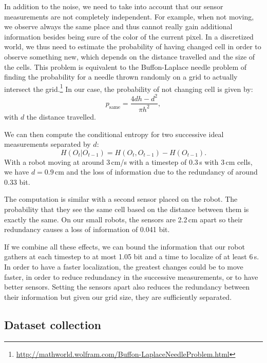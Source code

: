 \documentclass[letterpaper, 10pt, conference]{ieeeconf}
\begin{document}
In addition to the noise, we need to take into account that our sensor measurements are not completely independent.
For example, when not moving, we observe always the same place and thus cannot really gain additional information besides being sure of the color of the current pixel.
In a discretized world, we thus need to estimate the probability of having changed cell in order to observe something new, which depends on the distance travelled and the size of the cells.
This problem is equivalent to the Buffon-Laplace needle problem of finding the probability for a needle thrown randomly on a grid to actually intersect the grid.\footnote{\url{http://mathworld.wolfram.com/Buffon-LaplaceNeedleProblem.html}}
In our case, the probability of not changing cell is given by:
\begin{displaymath}
	p_{\mbox{same}} = \frac{4d h - d^2}{\pi h^2},
\end{displaymath}
with $d$ the distance travelled.

We can then compute the conditional entropy for two successive ideal measurements separated by $d$:
\begin{displaymath}
	H(O_t | O_{t-1}) = H(O_t, O_{t-1}) - H(O_{t-1}).
\end{displaymath}
With a robot moving at around 3\,cm/s with a timestep of 0.3\,s with 3\,cm cells, we have $d=0.9$\,cm and the loss of information due to the redundancy of around 0.33 bit.

The computation is similar with a second sensor placed on the robot.
The probability that they see the same cell based on the distance between them is exactly the same.
On our small robots, the sensors are 2.2\,cm apart so their redundancy causes a loss of information of 0.041 bit.

If we combine all these effects, we can bound the information that our robot gathers at each timestep to at most 1.05 bit and a time to localize of at least 6\,s.
In order to have a faster localization, the greatest changes could be to move faster, in order to reduce redundancy in the successive measurements, or to have better sensors.
Setting the sensors apart also reduces the redundancy between their information but given our grid size, they are sufficiently separated.

\subsection{Dataset collection}
\end{document}
